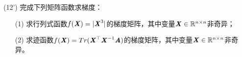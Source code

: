 \documentclass[12pt,a4paper,openany,twoside]{ctexbook}
\begin{document}
%	


\begin{exercise}(12')
	完成下列矩阵函数求梯度：
	\begin{itemize}
		\item [(1)] 求行列式函数$f(\boldsymbol{\mathit{X}})=|\boldsymbol{\mathit{X}}^3|$的梯度矩阵，其中变量$\boldsymbol{\mathit{X}} \in \mathbb{R}^{n\times n} $非奇异；
		\item [(2)] 求迹函数$f(\boldsymbol{\mathit{X}}) = Tr(\boldsymbol{\mathit{X}}^\top\boldsymbol{\mathit{X}}^{-1}\boldsymbol{\mathit{A}})$的梯度矩阵，其中变量$\boldsymbol{\mathit{X}} \in \mathbb{R}^{n\times n} $非奇异。
	\end{itemize}
\end{exercise}
%	
%	
%	
%	
%	
\end{document}
